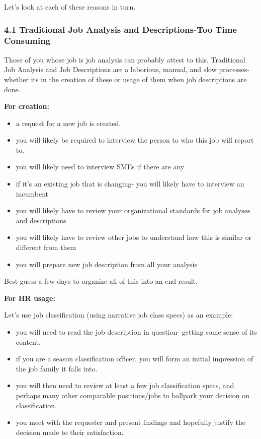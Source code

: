\documentclass[12pt,letterpaper]{article}
\begin{document}
{{{Let's look at each of these reasons in turn.

\subsubsection{4.1 Traditional Job Analysis and Descriptions-Too Time
Consuming}

Those of you whose job is job analysis can probably attest to this.
Traditional Job Analysis and Job Descriptions are a laborious, manual,
and slow processes- whether its in the creation of these or usage of
them when job descriptions are done.

\textbf{For creation:}

\begin{itemize}
\item
  a request for a new job is created.
\item
  you will likely be required to interview the person to who this job
  will report to.
\item
  you will likely need to interview SMEs if there are any
\item
  if it's an existing job that is changing- you will likely have to
  interview an incumbent
\item
  you will likely have to review your organizational standards for job
  analyses and descriptions
\item
  you will likely have to review other jobs to understand how this is
  similar or different from them
\item
  you will prepare new job description from all your analysis
\end{itemize}

Best guess-a few days to organize all of this into an end result.

\textbf{For HR usage:}

Let's use job classification (using narrative job class specs) as an
example:

\begin{itemize}
\item
  you will need to read the job description in question- getting some
  sense of its content.
\item
  if you are a season classification officer, you will form an initial
  impression of the job family it falls into.
\item
  you will then need to review at least a few job classification specs,
  and perhaps many other comparable positions/jobs to ballpark your
  decision on classification.
\item
  you meet with the requester and present findings and hopefully justify
  the decision made to their satisfaction.
\end{itemize}

}}}
\end{document}

